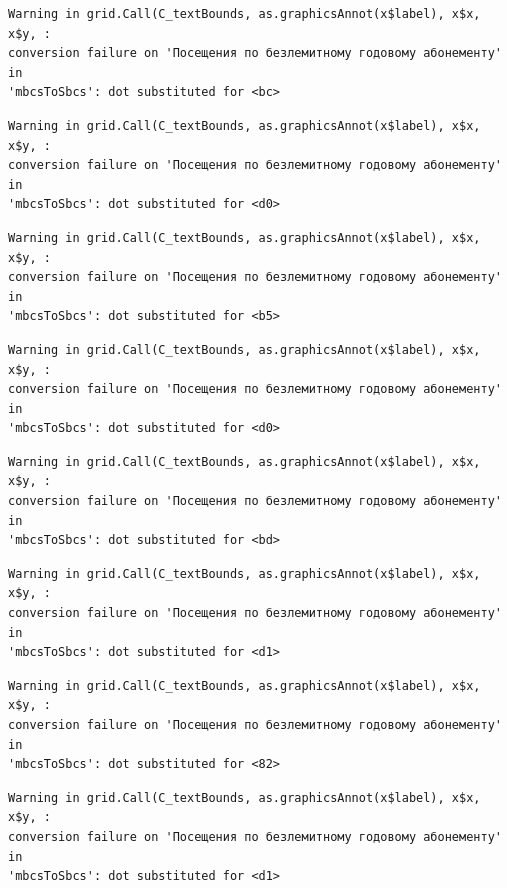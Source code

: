 \documentclass[
  letterpaper,
  DIV=11,
  numbers=noendperiod]{scrartcl}
\begin{document}
\begin{verbatim}
Warning in grid.Call(C_textBounds, as.graphicsAnnot(x$label), x$x, x$y, :
conversion failure on 'Посещения по безлемитному годовому абонементу' in
'mbcsToSbcs': dot substituted for <bc>
\end{verbatim}

\begin{verbatim}
Warning in grid.Call(C_textBounds, as.graphicsAnnot(x$label), x$x, x$y, :
conversion failure on 'Посещения по безлемитному годовому абонементу' in
'mbcsToSbcs': dot substituted for <d0>
\end{verbatim}

\begin{verbatim}
Warning in grid.Call(C_textBounds, as.graphicsAnnot(x$label), x$x, x$y, :
conversion failure on 'Посещения по безлемитному годовому абонементу' in
'mbcsToSbcs': dot substituted for <b5>
\end{verbatim}

\begin{verbatim}
Warning in grid.Call(C_textBounds, as.graphicsAnnot(x$label), x$x, x$y, :
conversion failure on 'Посещения по безлемитному годовому абонементу' in
'mbcsToSbcs': dot substituted for <d0>
\end{verbatim}

\begin{verbatim}
Warning in grid.Call(C_textBounds, as.graphicsAnnot(x$label), x$x, x$y, :
conversion failure on 'Посещения по безлемитному годовому абонементу' in
'mbcsToSbcs': dot substituted for <bd>
\end{verbatim}

\begin{verbatim}
Warning in grid.Call(C_textBounds, as.graphicsAnnot(x$label), x$x, x$y, :
conversion failure on 'Посещения по безлемитному годовому абонементу' in
'mbcsToSbcs': dot substituted for <d1>
\end{verbatim}

\begin{verbatim}
Warning in grid.Call(C_textBounds, as.graphicsAnnot(x$label), x$x, x$y, :
conversion failure on 'Посещения по безлемитному годовому абонементу' in
'mbcsToSbcs': dot substituted for <82>
\end{verbatim}

\begin{verbatim}
Warning in grid.Call(C_textBounds, as.graphicsAnnot(x$label), x$x, x$y, :
conversion failure on 'Посещения по безлемитному годовому абонементу' in
'mbcsToSbcs': dot substituted for <d1>
\end{verbatim}
\end{document}
